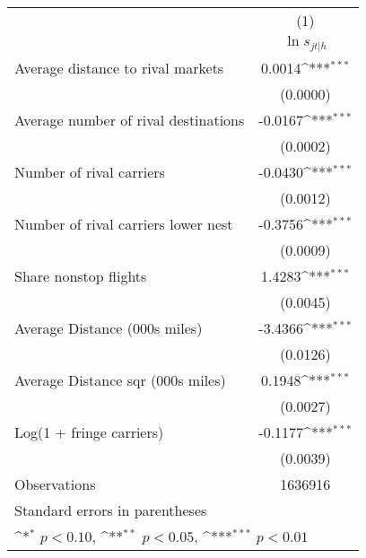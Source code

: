 {
\def\sym#1{\ifmmode^{#1}\else\(^{#1}\)\fi}
\begin{tabular}{l*{1}{c}}
\toprule
                    &\multicolumn{1}{c}{(1)}\\
                    &\multicolumn{1}{c}{$\ln s_{jt|h}$}\\
\midrule
Average distance to rival markets&      0.0014\sym{***}\\
                    &    (0.0000)         \\
\addlinespace
Average number of rival destinations&     -0.0167\sym{***}\\
                    &    (0.0002)         \\
\addlinespace
Number of rival carriers&     -0.0430\sym{***}\\
                    &    (0.0012)         \\
\addlinespace
Number of rival carriers lower nest&     -0.3756\sym{***}\\
                    &    (0.0009)         \\
\addlinespace
Share nonstop flights &      1.4283\sym{***}\\
                    &    (0.0045)         \\
\addlinespace
Average Distance (000s miles)&     -3.4366\sym{***}\\
                    &    (0.0126)         \\
\addlinespace
Average Distance sqr (000s miles)&      0.1948\sym{***}\\
                    &    (0.0027)         \\
\addlinespace
Log(1 + fringe carriers)&     -0.1177\sym{***}\\
                    &    (0.0039)         \\
\midrule
Observations        &     1636916         \\
\bottomrule
\multicolumn{2}{l}{\footnotesize Standard errors in parentheses}\\
\multicolumn{2}{l}{\footnotesize \sym{*} \(p<0.10\), \sym{**} \(p<0.05\), \sym{***} \(p<0.01\)}\\
\end{tabular}
}
